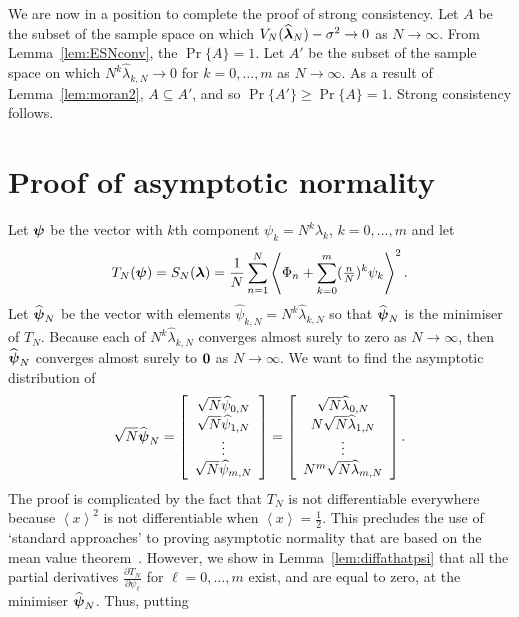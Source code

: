 \documentclass[aap,preprint]{imsart}
\newcommand{\prob}{\operatorname{Pr}}
\newcommand{\fracpart}[1]{\left\langle #1 \right\rangle}
\begin{document}
We are now in a position to complete the proof of strong consistency.  Let $A$ be the subset of the sample space on which  $V_N(\widehat{\boldsymbol{\lambda}}_N) - \sigma^2 \rightarrow 0$ as $N\rightarrow\infty$.  From Lemma~\ref{lem:ESNconv}, the $\prob\{A\} =1$.  Let $A'$ be the subset of the sample space on which $N^k\widehat{\lambda}_{k,N} \rightarrow 0$ for $k=0,\dots,m$ as $N\rightarrow\infty$.  As a result of Lemma~\ref{lem:moran2}, $A \subseteq A'$, and so $\prob\{A'\} \geq \prob\{A\} = 1$.  Strong consistency follows.

 
\section{Proof of asymptotic normality}\label{sec:centlimitproof}

Let $\boldsymbol{\psi}$ be the vector with $k$th component $\psi_k = N^k \lambda_k$, $k=0, \dots, m$ and let 
\[
T_{N}(\psibf) = S_N(\lambdabf) = \frac{1}{N} \sum_{n=1}^{N} \fracpart{ \Phi_n + \sum_{k=0}^m (\tfrac{n}{N})^k \psi_k }^2.
\]
Let $\widehat{\boldsymbol{\psi}}_N$ be the vector with elements $\widehat{\psi}_{k,N} = N^k \widehat{\lambda}_{k,N}$ so that $\widehat{\boldsymbol{\psi}}_N$ is the minimiser of $T_N$.  Because each of $N^k \widehat{\lambda}_{k,N}$ converges almost surely to zero as $N \rightarrow \infty$, then $\widehat{\boldsymbol{\psi}}_{N}$ converges almost surely to $\boldsymbol{0}$ as $N \rightarrow \infty$.  We want to find the asymptotic distribution of
\[
\sqrt{N}\widehat{\psibf}_{N} = 
\left[
\begin{array}
[c]{c}%
\sqrt{N} \widehat{\psi}_{0,N} \\ \sqrt{N}\widehat{\psi}_{1,N}  \\ \vdots \\ \sqrt{N} \widehat{\psi}_{m,N}
\end{array}
\right]
=
\left[
\begin{array}
[c]{c}%
\sqrt{N} \widehat{\lambda}_{0,N} \\ N\sqrt{N}\widehat{\lambda}_{1,N} \\ \vdots \\ N^m\sqrt{N} \widehat{\lambda}_{m,N}
\end{array}
\right].
\]
The proof is complicated by the fact that $T_N$ is not differentiable everywhere because $\fracpart{x}^2$ is not differentiable when $\fracpart{x} = \tfrac{1}{2}$.  This precludes the use of `standard approaches' to proving asymptotic normality that are based on the mean value theorem~\cite{vonMises_diff_stats_1947,Pollard_new_ways_clts_1986,Pollard_conv_stat_proc_1984,Pollard_asymp_empi_proc_1989}.  However, we show in Lemma~\ref{lem:diffathatpsi} that all the partial derivatives $\frac{\partial T_N}{\partial \psi_\ell}$ for $\ell = 0, \dots, m$ exist, and are equal to zero, at the minimiser $\widehat{\boldsymbol{\psi}}_N$.  Thus, putting
\end{document}
